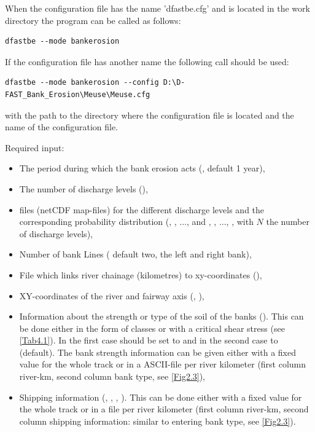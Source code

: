 When the configuration file has the name 'dfastbe.cfg' and is located in the work directory the program can be called as follows:

\begin{Verbatim}
dfastbe --mode bankerosion
\end{Verbatim}

If the configuration file has another name the following call should be used:

\begin{Verbatim}
dfastbe --mode bankerosion --config D:\D-FAST_Bank_Erosion\Meuse\Meuse.cfg
\end{Verbatim}

with  the path to the directory where the configuration file is located and  the name of the configuration file.

Required input:

\begin{itemize}
\item The period during which the bank erosion acts (, default 1 year),
\item The number of discharge levels (),
\item \dflowfm files (netCDF map-files) for the different discharge levels and the corresponding probability distribution (, , ...,  and , , ..., , with $N$ the number of discharge levels),
\item Number of bank Lines ( default two, the left and right bank),
\item File which links river chainage (kilometres) to xy-coordinates (),
\item XY-coordinates of the river and fairway axis (, ),
\item Information about the strength or type of the soil of the banks ().
This can be done either in the form of classes or with a critical shear stress (see \autoref{Tab4.1}).
In the first case  should be set to  and in the second case to  (default).
The bank strength information can be given either with a fixed value for the whole track or in a ASCII-file per river kilometer (first column river-km, second column bank type, see \autoref{Fig2.3}),
\item Shipping information (, , , ).
This can be done either with a fixed value for the whole track or in a file per river kilometer (first column river-km, second column shipping information: similar to entering bank type, see \autoref{Fig2.3}).
\end{itemize}

